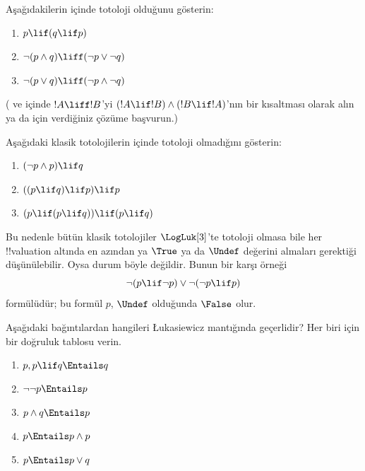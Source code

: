 \documentclass[../../../include/open-logic-section]{subfiles}
\begin{document}
\begin{prob}
  Aşağıdakilerin \LogLuk[3] içinde totoloji olduğunu gösterin:
  \begin{enumerate}
    \item $p \lif (q \lif p)$
    \item\label{mvl:thr:luk:prob:luk-taut-2} $\lnot(p \land q) \liff (\lnot p \lor \lnot q)$
    \item\label{mvl:thr:luk:prob:luk-taut-3} $\lnot(p \lor q) \liff (\lnot p \land \lnot q)$
  \end{enumerate}
  ( ve
   içinde $!A \liff !B$'yi
  $(!A \lif !B) \land (!B \lif !A)$'nın bir kısaltması olarak alın ya da
   için verdiğiniz çözüme başvurun.)
\end{prob}

\begin{prob}
  Aşağıdaki klasik totolojilerin \LogLuk[3] içinde totoloji olmadığını
  gösterin:
  \begin{enumerate}
    \item $(\lnot p \land p) \lif q$
    \item $((p \lif q) \lif p) \lif p$
    \item $(p \lif (p \lif q)) \lif (p \lif q)$
  \end{enumerate}
\end{prob}

Bu nedenle bütün klasik totolojiler $\LogLuk[3]$'te totoloji olmasa bile her
!!{valuation} altında en azından ya $\True$ ya da $\Undef$ değerini almaları
gerektiği düşünülebilir. Oysa durum böyle değildir. Bunun bir karşı örneği
\[
  \lnot(p \lif \lnot p) \lor \lnot(\lnot p \lif p)
\]
formülüdür; bu formül $p$, $\Undef$ olduğunda $\False$ olur.

\begin{prob}
  Aşağıdaki bağıntılardan hangileri \L ukasiewicz mantığında geçerlidir? Her
  biri için bir doğruluk tablosu verin.
  \begin{enumerate}
    \item $p, p \lif q \Entails q$
    \item $\lnot\lnot p \Entails p$
    \item $p \land q \Entails p$
    \item $p \Entails p \land p$
    \item $p \Entails p \lor q$
  \end{enumerate}
\end{prob}
\end{document}
